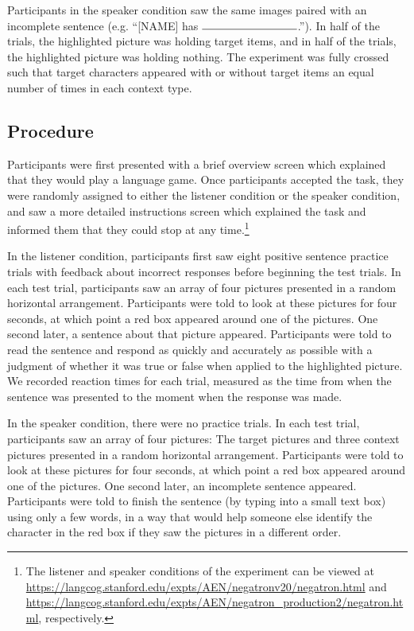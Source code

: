 \documentclass[man, noapacite]{apa2}
\begin{document}
Participants in the speaker condition saw the same images paired with an incomplete sentence (e.g. ``[NAME] has $\rule{3cm}{0.15mm}$.''). In half of the trials, the highlighted picture was holding target items, and in half of the trials, the highlighted picture was holding nothing.  The experiment was fully crossed such that target characters appeared with or without target items an equal number of times in each context type.  

\subsection{Procedure}

Participants were first presented with a brief overview screen which explained that they would play a language game.  Once participants accepted the task, they were randomly assigned to either the listener condition or the speaker condition, and saw a more detailed instructions screen which explained the task and informed them that they could stop at any time.\footnote{The listener and speaker conditions of the experiment can be viewed at \url{https://langcog.stanford.edu/expts/AEN/negatronv20/negatron.html} and \url{https://langcog.stanford.edu/expts/AEN/negatron_production2/negatron.html}, respectively.}

In the listener condition, participants first saw eight positive sentence practice trials with feedback about incorrect responses before beginning the test trials. In each test trial, participants saw an array of four pictures presented in a random horizontal arrangement.  Participants were told to look at these pictures for four seconds, at which point a red box appeared around one of the pictures.  One second later, a sentence about that picture appeared.  Participants were told to read the sentence and respond as quickly and accurately as possible with a judgment of whether it was true or false when applied to the highlighted picture.  We recorded reaction times for each trial, measured as the time from when the sentence was presented to the moment when the response was made.

In the speaker condition, there were no practice trials. In each test trial, participants saw an array of four pictures: The target pictures and three context pictures presented in a random horizontal arrangement.  Participants were told to look at these pictures for four seconds, at which point a red box appeared around one of the pictures.  One second later, an incomplete sentence appeared.  Participants were told to finish the sentence (by typing into a small text box) using only a few words, in a way that would help someone else identify the character in the red box if they saw the pictures in a different order.
  
\end{document}
